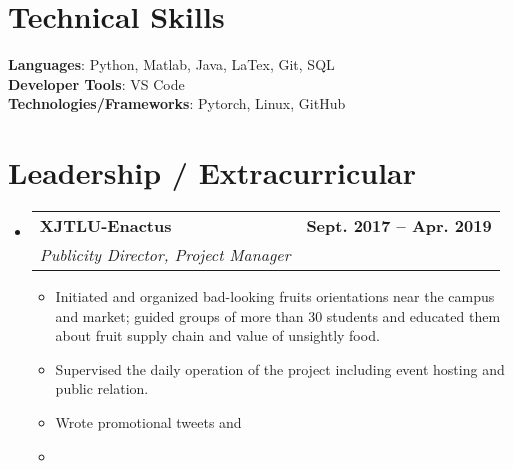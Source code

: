 \documentclass[letterpaper,11pt]{article}
\makeatletter
\newcommand{\resumeItem}[1]{
  \item\small{
    {#1 \vspace{-2pt}}
  }
}
\newcommand{\resumeSubheading}[4]{
  \vspace{-2pt}\item
    \begin{tabular*}{1.0\textwidth}[t]{l@{\extracolsep{\fill}}r}
      \textbf{#1} & \textbf{\small #2} \\
      \textit{\small#3} & \textit{\small #4} \\
    \end{tabular*}\vspace{-7pt}
}
\newcommand{\resumeSubHeadingListStart}{\begin{itemize}[leftmargin=0.0in, label={}]}
\newcommand{\resumeSubHeadingListEnd}{\end{itemize}}
\newcommand{\resumeItemListStart}{\begin{itemize}}
\newcommand{\resumeItemListEnd}{\end{itemize}\vspace{-5pt}}
\makeatother
\begin{document}
%
\section{Technical Skills}
 \begin{itemize}[leftmargin=0.15in, label={}]
    \small{\item{
     \textbf{Languages}{: Python, Matlab, Java, LaTex, Git, SQL} \\
     \textbf{Developer Tools}{: VS Code} \\
     \textbf{Technologies/Frameworks}{: Pytorch, Linux, GitHub} \\
    }}
 \end{itemize}
 \vspace{-16pt}


\section{Leadership / Extracurricular}
    \resumeSubHeadingListStart
        \resumeSubheading{XJTLU-Enactus}{Sept. 2017 -- Apr. 2019}{Publicity Director, Project Manager}{}
            \resumeItemListStart
                \resumeItem{Initiated and organized bad-looking fruits orientations near the campus and market; guided groups of more than 30 students and educated them about fruit supply chain and value of unsightly food.}
                \resumeItem{Supervised the daily operation of the project including event hosting and public relation.}
                \resumeItem{Wrote promotional tweets and }
                \resumeItem{}
            \resumeItemListEnd
        
    \resumeSubHeadingListEnd
\end{document}
